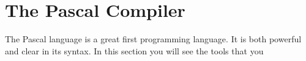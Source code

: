 \clearpage
\def\pageLang{pas}
\section{The Pascal Compiler} %
\label{sec:the_pascal_compiler}

The Pascal language is a great first programming language. It is both powerful and clear in its syntax. In this section you will see the tools that you 





